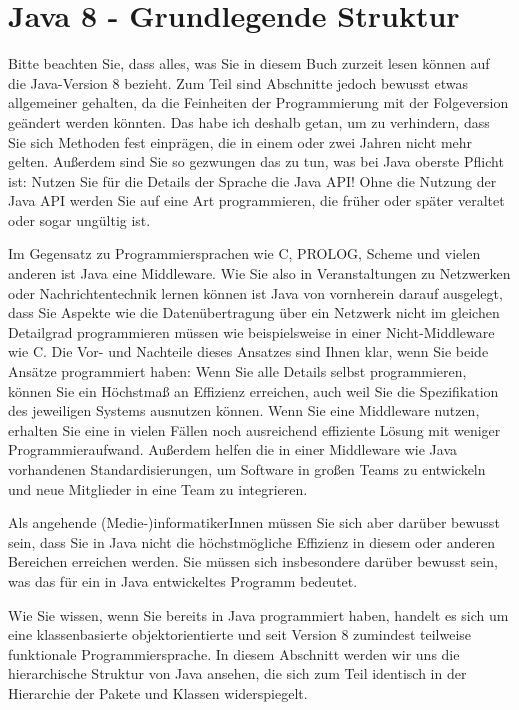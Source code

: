\section{Java 8 - Grundlegende Struktur}

Bitte beachten Sie, dass alles, was Sie in diesem Buch zurzeit lesen können auf die Java-Version 8 bezieht. Zum Teil sind Abschnitte jedoch bewusst etwas allgemeiner gehalten, da die Feinheiten der Programmierung mit der Folgeversion geändert werden könnten. Das habe ich deshalb getan, um zu verhindern, dass Sie sich Methoden fest einprägen, die in einem oder zwei Jahren nicht mehr gelten. Außerdem sind Sie so gezwungen das zu tun, was bei Java oberste Pflicht ist: Nutzen Sie für die Details der Sprache die Java API! Ohne die Nutzung der Java API werden Sie auf eine Art programmieren, die früher oder später veraltet oder sogar ungültig ist.

Im Gegensatz zu Programmiersprachen wie C, PROLOG, Scheme und vielen anderen ist Java eine Middleware. Wie Sie also in Veranstaltungen zu Netzwerken oder Nachrichtentechnik lernen können ist Java von vornherein darauf ausgelegt, dass Sie Aspekte wie die Datenübertragung über ein Netzwerk nicht im gleichen Detailgrad programmieren müssen wie beispielsweise in einer Nicht-Middleware wie C. Die Vor- und Nachteile dieses Ansatzes sind Ihnen klar, wenn Sie beide Ansätze programmiert haben: Wenn Sie alle Details selbst programmieren, können Sie ein Höchstmaß an Effizienz erreichen, auch weil Sie die Spezifikation des jeweiligen Systems ausnutzen können. Wenn Sie eine Middleware nutzen, erhalten Sie eine in vielen Fällen noch ausreichend effiziente Lösung mit weniger Programmieraufwand. Außerdem helfen die in einer Middleware wie Java vorhandenen Standardisierungen, um Software in großen Teams zu entwickeln und neue Mitglieder in eine Team zu integrieren.

Als angehende (Medie-)informatikerInnen müssen Sie sich aber darüber bewusst sein, dass Sie in Java nicht die höchstmögliche Effizienz in diesem oder anderen Bereichen erreichen werden. Sie müssen sich insbesondere darüber bewusst sein, was das für ein in Java entwickeltes Programm bedeutet.

Wie Sie wissen, wenn Sie bereits in Java programmiert haben, handelt es sich um eine klassenbasierte objektorientierte und seit Version 8 zumindest teilweise funktionale Programmiersprache. In diesem Abschnitt werden wir uns die hierarchische Struktur von Java ansehen, die sich zum Teil identisch in der Hierarchie der Pakete und Klassen widerspiegelt.

